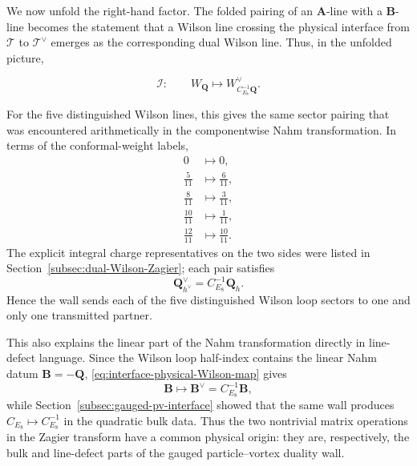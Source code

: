 \documentclass[11pt,a4paper]{article}
\numberwithin{equation}{section}
\begin{document}
We now unfold the right-hand factor.  The folded pairing of an $\boldsymbol A$-line with a $\boldsymbol B$-line becomes the statement that a Wilson line crossing the physical interface from $\mathcal T$ to $\mathcal T^\vee$ emerges as the corresponding dual Wilson line.  Thus, in the unfolded picture,

\begin{equation}
  \mathcal I:\qquad
  W_{\boldsymbol Q}
  \longmapsto
  W_{C_{E_8}^{-1}\boldsymbol Q}^{\vee}.
  \label{eq:interface-physical-Wilson-map}
\end{equation}

For the five distinguished Wilson lines, this gives the same sector pairing that was encountered arithmetically in the componentwise Nahm transformation.  In terms of the conformal-weight labels,
\begin{equation}
\begin{aligned}
  0&\longmapsto0,\\
  \frac5{11}&\longmapsto\frac6{11},\\
  \frac8{11}&\longmapsto\frac3{11},\\
  \frac{10}{11}&\longmapsto\frac1{11},\\
  \frac{12}{11}&\longmapsto\frac{10}{11}.
\end{aligned}
  \label{eq:interface-five-sector-map}
\end{equation}
The explicit integral charge representatives on the two sides were listed in Section~\ref{subsec:dual-Wilson-Zagier}; each pair satisfies
\begin{equation}
  \boldsymbol Q_{h^\vee}^{\vee}
  =C_{E_8}^{-1}\boldsymbol Q_h.
  \label{eq:interface-five-charge-map}
\end{equation}
Hence the wall sends each of the five distinguished Wilson loop sectors to one and only one transmitted partner.

This also explains the linear part of the Nahm transformation directly in line-defect language.  Since the Wilson loop half-index contains the linear Nahm datum $\boldsymbol B=-\boldsymbol Q$, \eqref{eq:interface-physical-Wilson-map} gives
\begin{equation}
  \boldsymbol B
  \longmapsto
  \boldsymbol B^\vee
  =C_{E_8}^{-1}\boldsymbol B,
  \label{eq:interface-Nahm-linear-map}
\end{equation}
while Section~\ref{subsec:gauged-pv-interface} showed that the same wall produces $C_{E_8}\mapsto C_{E_8}^{-1}$ in the quadratic bulk data.  Thus the two nontrivial matrix operations in the Zagier transform have a common physical origin: they are, respectively, the bulk and line-defect parts of the gauged particle--vortex duality wall.
\end{document}
